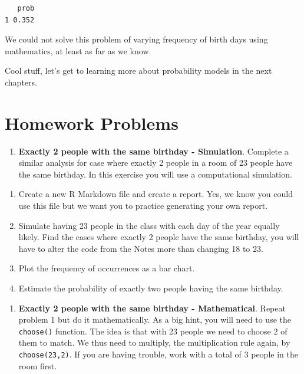 \documentclass[
  letterpaper,
  DIV=11,
  numbers=noendperiod]{scrreprt}
\providecommand{\tightlist}{%
  \setlength{\itemsep}{0pt}\setlength{\parskip}{0pt}}\usepackage{longtable,booktabs,array}
\begin{document}
\begin{verbatim}
   prob
1 0.352
\end{verbatim}

We could not solve this problem of varying frequency of birth days using
mathematics, at least as far as we know.

Cool stuff, let's get to learning more about probability models in the
next chapters.

\section{Homework Problems}\label{homework-problems-6}

\begin{enumerate}
\def\labelenumi{\arabic{enumi}.}
\tightlist
\item
  \textbf{Exactly 2 people with the same birthday - Simulation}.
  Complete a similar analysis for case where exactly 2 people in a room
  of 23 people have the same birthday. In this exercise you will use a
  computational simulation.
\end{enumerate}

\begin{enumerate}
\def\labelenumi{\alph{enumi}.}
\tightlist
\item
  Create a new R Markdown file and create a report. Yes, we know you
  could use this file but we want you to practice generating your own
  report.\\
\item
  Simulate having 23 people in the class with each day of the year
  equally likely. Find the cases where exactly 2 people have the same
  birthday, you will have to alter the code from the Notes more than
  changing 18 to 23.\\
\item
  Plot the frequency of occurrences as a bar chart.\\
\item
  Estimate the probability of exactly two people having the same
  birthday.
\end{enumerate}

\begin{enumerate}
\def\labelenumi{\arabic{enumi}.}
\setcounter{enumi}{1}
\tightlist
\item
  \textbf{Exactly 2 people with the same birthday - Mathematical}.
  Repeat problem 1 but do it mathematically. As a big hint, you will
  need to use the \texttt{choose()} function. The idea is that with 23
  people we need to choose 2 of them to match. We thus need to multiply,
  the multiplication rule again, by \texttt{choose(23,2)}. If you are
  having trouble, work with a total of 3 people in the room first.
\end{enumerate}
\end{document}
